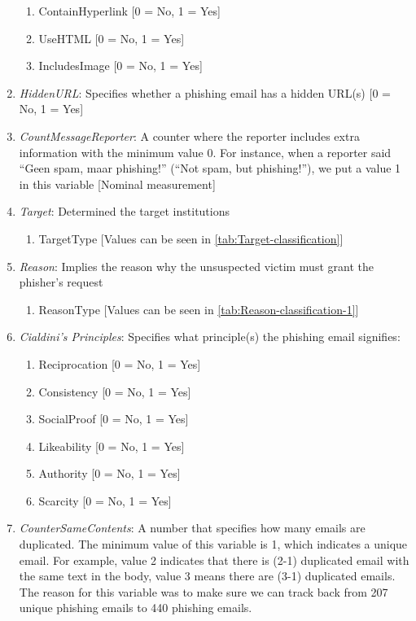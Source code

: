\begin{enumerate}
\begin{enumerate}
\item ContainHyperlink {[}0 = No, 1 = Yes{]}
\item UseHTML {[}0 = No, 1 = Yes{]}
\item IncludesImage {[}0 = No, 1 = Yes{]}
\end{enumerate}
\item \emph{HiddenURL}: Specifies whether a phishing email has a hidden
URL(s) {[}0 = No, 1 = Yes{]}
\item \emph{CountMessageReporter}: A counter where the reporter includes
extra information with the minimum value 0. For instance, when a reporter
said \textquotedblleft Geen spam, maar phishing!\textquotedblright{}
(\textquotedblleft Not spam, but phishing!\textquotedblright ), we
put a value 1 in this variable {[}Nominal measurement{]}
\item \emph{Target}: Determined the target institutions

\begin{enumerate}
\item TargetType {[}Values can be seen in \autoref{tab:Target-classification}{]}
\end{enumerate}
\item \emph{Reason}: Implies the reason why the unsuspected victim must
grant the phisher's request

\begin{enumerate}
\item ReasonType {[}Values can be seen in \autoref{tab:Reason-classification-1}{]}
\end{enumerate}
\item \emph{Cialdini's Principles}: Specifies what principle(s) the phishing
email signifies:

\begin{enumerate}
\item Reciprocation {[}0 = No, 1 = Yes{]}
\item Consistency {[}0 = No, 1 = Yes{]}
\item SocialProof {[}0 = No, 1 = Yes{]}
\item Likeability {[}0 = No, 1 = Yes{]}
\item Authority {[}0 = No, 1 = Yes{]}
\item Scarcity {[}0 = No, 1 = Yes{]}
\end{enumerate}
\item \emph{CounterSameContents}: A number that specifies how many emails
are duplicated. The minimum value of this variable is 1, which indicates
a unique email. For example, value 2 indicates that there is (2-1)
duplicated email with the same text in the body, value 3 means there
are (3-1) duplicated emails. The reason for this variable was to make
sure we can track back from 207 unique phishing emails to 440 phishing
emails.
\end{enumerate}
